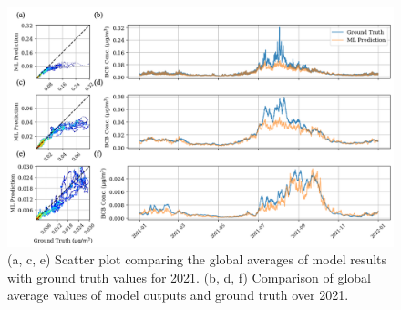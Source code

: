 \documentclass{article}
\begin{document}
    \begin{figure}[htbp]
        \centering
        \includegraphics[width=\linewidth]{global_average_2021.png}
        \caption{(a, c, e) Scatter plot comparing the global averages of model results with ground truth values for 2021. (b, d, f) Comparison of global average values of model outputs and ground truth over 2021.}
        \label{fig:global_average_2021}
    \end{figure}
\end{document}
